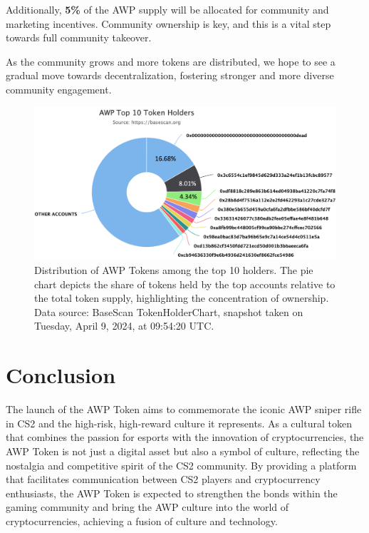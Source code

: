 \documentclass[journal,onecolumn,]{IEEEtran}
\begin{document}
Additionally, \textbf{5\%} of the AWP supply will be allocated for community and marketing incentives. Community ownership is key, and this is a vital step towards full community takeover.

As the community grows and more tokens are distributed, we hope to see a gradual move towards decentralization, fostering stronger and more diverse community engagement.

\begin{figure}[h]
	\centering
	\includegraphics[width=1\linewidth]{figure/token_distribution2.png}
	\caption{Distribution of AWP Tokens among the top 10 holders. The pie chart depicts the share of tokens held by the top accounts relative to the total token supply, highlighting the concentration of ownership. Data source\cite{AWPTokenContract}: BaseScan TokenHolderChart, snapshot taken on Tuesday, April 9, 2024, at 09:54:20 UTC.}
	\label{pic:token_distribution}
\end{figure}

	
	\section{Conclusion}
	
	The launch of the AWP Token aims to commemorate the iconic AWP sniper rifle in CS2 and the high-risk, high-reward culture it represents. As a cultural token that combines the passion for esports with the innovation of cryptocurrencies, the AWP Token is not just a digital asset but also a symbol of culture, reflecting the nostalgia and competitive spirit of the CS2 community. By providing a platform that facilitates communication between CS2 players and cryptocurrency enthusiasts, the AWP Token is expected to strengthen the bonds within the gaming community and bring the AWP culture into the world of cryptocurrencies, achieving a fusion of culture and technology.
	
\end{document}
